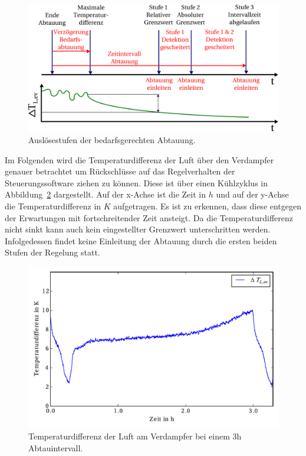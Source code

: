 \begin{figure}[h!]
\centering
\includegraphics[scale=0.54]{Pictures/defrostintervall.pdf}
\caption{Auslösestufen der bedarfsgerechten Abtauung.}
\label{fig:bedarfsgerechteAbtauung}
\end{figure}

Im Folgenden wird die Temperaturdifferenz der Luft über den Verdampfer genauer betrachtet um Rückschlüsse auf das Regelverhalten der Steuerungssoftware ziehen zu können. Diese ist über einen Kühlzyklus in Abbildung~\ref{fig:deltaTLuftevap51} dargestellt. Auf der x-Achse ist die Zeit in $h$ und auf der y-Achse die Temperaturdifferenz in $K$ aufgetragen. Es ist zu erkennen, dass diese entgegen der Erwartungen mit fortschreitender Zeit ansteigt. Da die Temperaturdifferenz nicht sinkt kann auch kein eingestellter Grenzwert unterschritten werden. Infolgedessen findet keine Einleitung der Abtauung durch die ersten beiden Stufen der Regelung statt. 

\begin{figure}[h!]
\centering
\includegraphics[scale=0.8]{Pictures/51/delTaT_evap1.pdf}
\caption{Temperaturdifferenz der Luft am Verdampfer bei einem 3h Abtauintervall.}
\label{fig:deltaTLuftevap51}
\end{figure}

